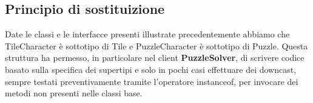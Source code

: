 	\subsection{Principio di sostituizione}
Date le classi e le interfacce presenti illustrate precedentemente abbiamo che TileCharacter è sottotipo di Tile e PuzzleCharacter è sottotipo di Puzzle. Questa struttura ha permesso, in particolare nel client \textbf{PuzzleSolver}, di scrivere codice basato sulla specifica dei supertipi e solo in pochi casi effettuare dei downcast, sempre testati preventivamente tramite l'operatore instanceof, per invocare dei metodi non presenti nelle classi base.
